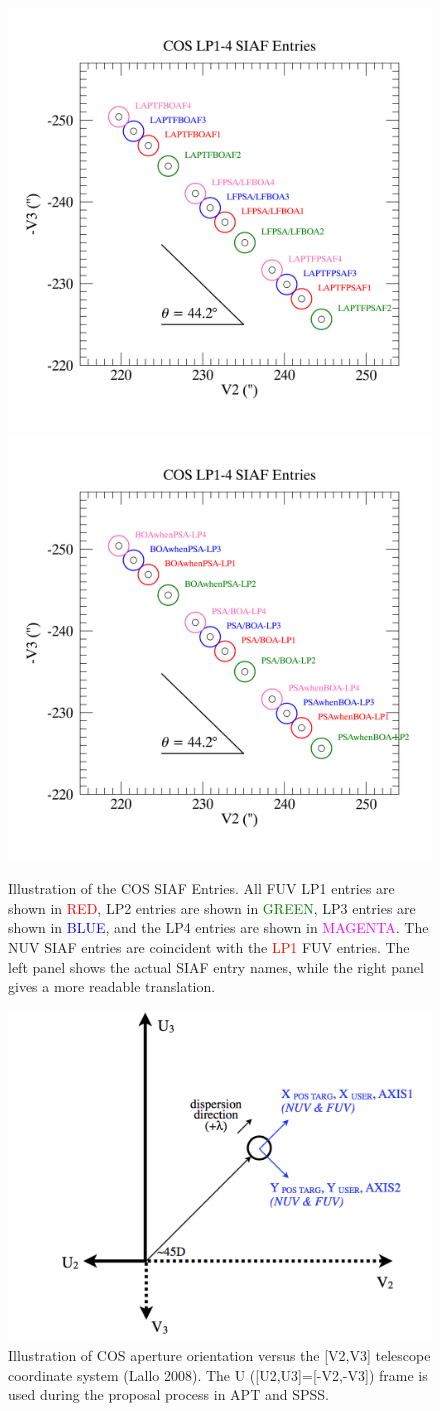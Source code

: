 \begin{figure}[htb]
\noindent\includegraphics*[width=0.485\linewidth]{png/LP4_SIAF_positions.png}
\noindent\includegraphics*[width=0.485\linewidth]{png/LP4_SIAF_positions_sname.png}
\caption[Illustration of COS SIAF Entries]{
Illustration of the COS SIAF Entries.  All FUV LP1 entries are shown in \textcolor{RED}{RED},
LP2 entries are shown in \textcolor{GREEN}{GREEN}, LP3 entries are shown in \textcolor{BLUE}{BLUE},
and the LP4 entries are shown in \textcolor{MAGENTA}{MAGENTA}.
The NUV SIAF entries are coincident with the \textcolor{RED}{LP1} FUV entries.
The left panel shows the actual SIAF entry names, while the right panel gives a more readable translation.\label{fig:SIAF1}}
\end{figure}

\begin{figure}[htb]
\noindent\includegraphics*[width=0.795\linewidth]{png/ADXD_V23.png}
\caption[Illustration of COS Aperture Orientation]{Illustration of COS aperture orientation versus the [V2,V3] telescope coordinate system (Lallo 2008).
The U ([U2,U3]=[-V2,-V3]) frame is used during the proposal process in APT and SPSS.\label{fig:ADXDV23}}
\end{figure}




